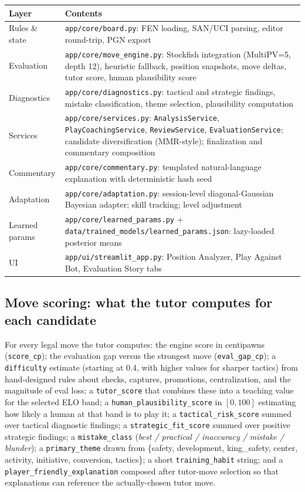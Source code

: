 \documentclass[11pt]{article}
\begin{document}
\begin{center}
\begin{tabular}{@{}p{2.6cm}p{11cm}@{}}
\toprule
\textbf{Layer} & \textbf{Contents} \\
\midrule
Rules \& state & \texttt{app/core/board.py}: FEN loading, SAN/UCI parsing, editor round-trip, PGN export \\
Evaluation & \texttt{app/core/move\_engine.py}: Stockfish integration (MultiPV=5, depth 12), heuristic fallback, position snapshots, move deltas, tutor score, human plausibility score \\
Diagnostics & \texttt{app/core/diagnostics.py}: tactical and strategic findings, mistake classification, theme selection, plausibility computation \\
Services & \texttt{app/core/services.py}: \texttt{AnalysisService}, \texttt{PlayCoachingService}, \texttt{ReviewService}, \texttt{EvaluationService}; candidate diversification (MMR-style); finalization and commentary composition \\
Commentary & \texttt{app/core/commentary.py}: templated natural-language explanation with deterministic hash seed \\
Adaptation & \texttt{app/core/adaptation.py}: session-level diagonal-Gaussian Bayesian adapter; skill tracking; level adjustment \\
Learned params & \texttt{app/core/learned\_params.py} + \texttt{data/trained\_models/learned\_params.json}: lazy-loaded posterior means \\
UI & \texttt{app/ui/streamlit\_app.py}: Position Analyzer, Play Against Bot, Evaluation Story tabs \\
\bottomrule
\end{tabular}
\end{center}

\subsection{Move scoring: what the tutor computes for each candidate}
For every legal move the tutor computes: the engine score in centipawns (\texttt{score\_cp}); the evaluation gap versus the strongest move (\texttt{eval\_gap\_cp}); a \texttt{difficulty} estimate (starting at 0.4, with higher values for sharper tactics) from hand-designed rules about checks, captures, promotions, centralization, and the magnitude of eval loss; a \texttt{tutor\_score} that combines these into a teaching value for the selected ELO band; a \texttt{human\_plausibility\_score} in $[0,100]$ estimating how likely a human at that band is to play it; a \texttt{tactical\_risk\_score} summed over tactical diagnostic findings; a \texttt{strategic\_fit\_score} summed over positive strategic findings; a \texttt{mistake\_class} (\emph{best / practical / inaccuracy / mistake / blunder}); a \texttt{primary\_theme} drawn from \{safety, development, king\_safety, center, activity, initiative, conversion, tactics\}; a short \texttt{training\_habit} string; and a \texttt{player\_friendly\_explanation} composed after tutor-move selection so that explanations can reference the actually-chosen tutor move.
\end{document}
